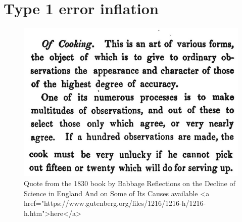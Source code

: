 \documentclass[
]{krantz}
\begin{document}
\hypertarget{type-1-error-inflation}{%
\section{Type 1 error inflation}\label{type-1-error-inflation}}

\begin{figure}

{\centering \includegraphics[width=1\linewidth]{images/babbagecooking} 

}

\caption{Quote from the 1830 book by Babbage Reflections on the Decline of Science in England And on Some of Its Causes available <a href="https://www.gutenberg.org/files/1216/1216-h/1216-h.htm">here</a>}\label{fig:cooking}
\end{figure}
\end{document}
